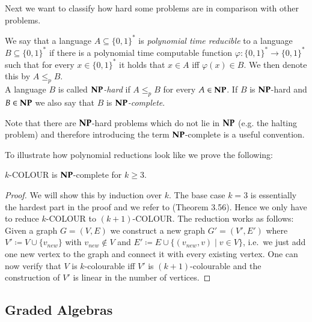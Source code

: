 Next we want to classify how hard some problems are in comparison with other problems.

\begin{Definition}
 We say that a language $A \subseteq {\lbrace 0,1 \rbrace}^*$ is \emph{polynomial time reducible} to a language 
 $B \subseteq {\lbrace 0,1 \rbrace}^*$ if there is a polynomial time computable function 
 ${\varphi \colon {\lbrace 0,1 \rbrace}^* \to {\lbrace 0,1 \rbrace}^*}$ such that for every $x \in {\lbrace 0,1 \rbrace}^*$ 
 it holds that $x \in A$ iff $\varphi (x) \in B$. We then denote this by $ A \leq_p B$. \\
 A language $B$ is called \emph{$\mathbf{NP}$-hard} if $A \leq_p B$ for every $A \in \mathbf{NP}$. If $B$ is $\mathbf{NP}$-hard
 and $B \in \mathbf{NP}$ we also say that $B$ is \emph{$\mathbf{NP}$-complete}.
\end{Definition}

\begin{Remark}
 Note that there are $\mathbf{NP}$-hard problems which do not lie in $\mathbf{NP}$ (e.g. the halting problem)
 and therefore introducing the term $\mathbf{NP}$-complete is a useful convention.
\end{Remark}


To illustrate how polynomial reductions look like we prove the following:

\begin{Theorem}
  $k$-COLOUR is $\mathbf{NP}$-complete for $k \geq 3$.
\end{Theorem}

\begin{proof}
 We will show this by induction over $k$.
 The base case $k = 3$ is essentially the hardest part in the proof and we refer to \cite{JorgRothe2008} (Theorem 3.56).
 Hence we only have to reduce $k$-COLOUR to $(k+1)$-COLOUR. The reduction works as follows: \newline
 Given a graph $G = (V,E)$ we construct a new graph $G' = (V', E')$ where $V' \coloneqq V \cup \lbrace v_{new} \rbrace$ with
 $v_{new} \notin V$ and $E' \coloneqq E \cup \lbrace (v_{new}, v) \; | \; v \in V \rbrace$, i.e.\ we just add one new vertex to the graph
 and connect it with every existing vertex. One can now verify that $V$ is $k$-colourable iff $V'$ is $(k+1)$-colourable and the
 construction of $V'$ is linear in the number of vertices.
 
\end{proof}

 
\subsection{Graded Algebras}

